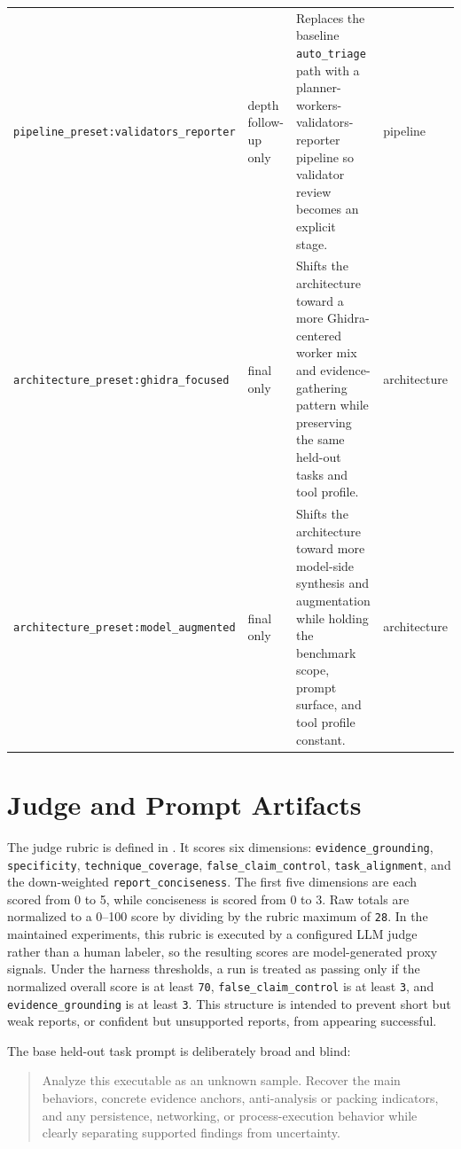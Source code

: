 \begin{longtable}{p{} p{} p{} p{}}
\texttt{pipeline\_preset:validators\_reporter} & depth follow-up only & Replaces the baseline \texttt{auto\_triage} path with a planner-workers-validators-reporter pipeline so validator review becomes an explicit stage. & pipeline \\
\texttt{architecture\_preset:ghidra\_focused} & final only & Shifts the architecture toward a more Ghidra-centered worker mix and evidence-gathering pattern while preserving the same held-out tasks and tool profile. & architecture \\
\texttt{architecture\_preset:model\_augmented} & final only & Shifts the architecture toward more model-side synthesis and augmentation while holding the benchmark scope, prompt surface, and tool profile constant. & architecture \\
\hline
\end{longtable}
\normalsize

\section{Judge and Prompt Artifacts}

The judge rubric is defined in . It scores six dimensions: \texttt{evidence\_grounding}, \texttt{specificity}, \texttt{technique\_coverage}, \texttt{false\_claim\_control}, \texttt{task\_alignment}, and the down-weighted \texttt{report\_conciseness}. The first five dimensions are each scored from 0 to 5, while conciseness is scored from 0 to 3. Raw totals are normalized to a 0--100 score by dividing by the rubric maximum of \texttt{28}. In the maintained experiments, this rubric is executed by a configured LLM judge rather than a human labeler, so the resulting scores are model-generated proxy signals. Under the harness thresholds, a run is treated as passing only if the normalized overall score is at least \texttt{70}, \texttt{false\_claim\_control} is at least \texttt{3}, and \texttt{evidence\_grounding} is at least \texttt{3}. This structure is intended to prevent short but weak reports, or confident but unsupported reports, from appearing successful.

The base held-out task prompt is deliberately broad and blind:

\begin{quote}\ttfamily
Analyze this executable as an unknown sample. Recover the main behaviors,
concrete evidence anchors, anti-analysis or packing indicators, and any
persistence, networking, or process-execution behavior while clearly
separating supported findings from uncertainty.
\end{quote}

